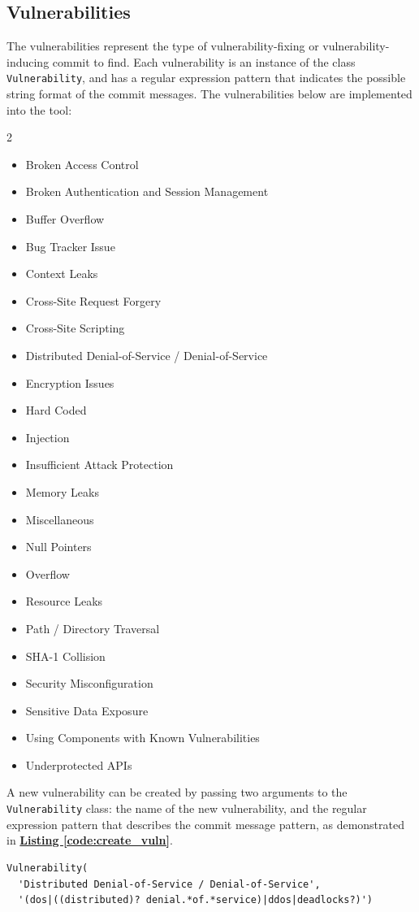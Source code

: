 \documentclass[12pt, a4paper]{report}
\begin{document}
\subsection{Vulnerabilities}
The vulnerabilities represent the type of vulnerability-fixing or vulnerability-inducing commit to
find. Each vulnerability is an instance of the class \texttt{Vulnerability}, and has a regular
expression pattern that indicates the possible string format of the commit messages. The
vulnerabilities below are implemented into the tool:

\begin{multicols} {2}
  \raggedright
  \begin{itemize}
    \item Broken Access Control
    \item Broken Authentication and Session Management
    \item Buffer Overflow
    \item Bug Tracker Issue
    \item Context Leaks
    \item Cross-Site Request Forgery
    \item Cross-Site Scripting
    \item Distributed Denial-of-Service / Denial-of-Service
    \item Encryption Issues
    \item Hard Coded
    \item Injection
    \item Insufficient Attack Protection
    \item Memory Leaks
    \item Miscellaneous
    \item Null Pointers
    \item Overflow
    \item Resource Leaks
    \item Path / Directory Traversal
    \item SHA-1 Collision
    \item Security Misconfiguration
    \item Sensitive Data Exposure
    \item Using Components with Known Vulnerabilities
    \item Underprotected APIs
  \end{itemize}
\end{multicols}

A new vulnerability can be created by passing two arguments to the \texttt{Vulnerability} class: the
name of the new vulnerability, and the regular expression pattern that describes the commit message
pattern, as demonstrated in \hyperref[code:create_vuln]{\textbf{Listing \ref*{code:create_vuln}}}.
\begin{lstlisting}[basicstyle=\ttfamily, label=code:create_vuln,
  caption=Creating a new instance of \texttt{Vulnerability}.]
Vulnerability(
  'Distributed Denial-of-Service / Denial-of-Service',
  '(dos|((distributed)? denial.*of.*service)|ddos|deadlocks?)')
\end{lstlisting}
\end{document}
